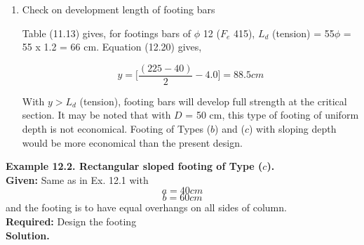 \documentclass{book}
\begin{document}
\begin{enumerate}
        \item Check on development length of footing bars

Table (11.13) gives, for footings bars of $\phi$ 12 ($F_e$ 415),
$L_d$ (tension) = 55$\phi$ = 55 x 1.2 = 66 cm.
Equation (12.20) gives, 

$$y=\bigg[\frac{(225-40)}{2}-4.0\bigg]=88.5cm$$

With $y > L_d$ (tension), footing bars will develop full strength at the critical section. It may be noted that with $D$ = 50 cm, this type of footing of uniform depth is not economical. Footing of Types ($b$) and ($c$) with sloping depth would be more economical than the present design.\\
\end{enumerate} 

\textbf{ Example 12.2. Rectangular sloped footing of Type ($c$).}\\
\textbf{Given:}
Same as in Ex. 12.1 with\\
$$a = 40 cm$$
$$b = 60 cm$$ 
and the footing is to have equal overhangs on all sides of column.\\
\textbf{Required:} Design the footing\\
\textbf{Solution.}
\end{document}
